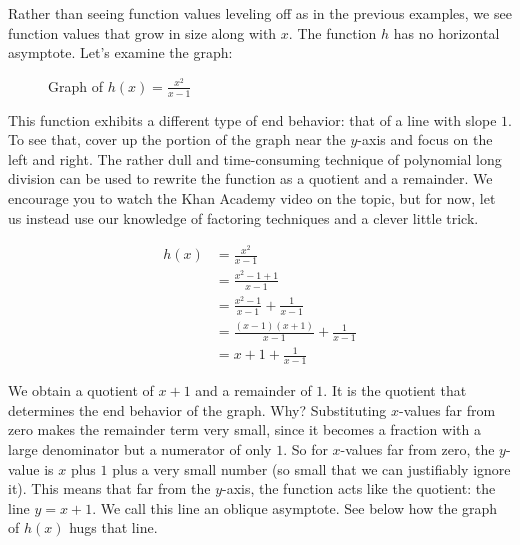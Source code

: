 Rather than seeing function values leveling off as in the previous examples, we see function values that grow in size along with \( x \). The function \( h \) has no horizontal asymptote. Let's examine the graph:

\begin{figure}[htbp]
  \centering
  \caption{Graph of \( h(x) = \frac{x^2}{x - 1} \)}
\end{figure}

This function exhibits a different type of end behavior: that of a line with slope \( 1 \). To see that, cover up the portion of the graph near the \( y \)-axis and focus on the left and right. The rather dull and time-consuming technique of polynomial long division can be used to rewrite the function as a quotient and a remainder. We encourage you to watch the Khan Academy video on the topic, but for now, let us instead use our knowledge of factoring techniques and a clever little trick.

\begin{equation} \label{eq1}
\begin{split}
h(x) & = \frac{x^2}{x - 1} \\
& = \frac{x^2 - 1 + 1}{x - 1} \\ 
& = \frac{x^2 - 1}{x - 1} + \frac{1}{x - 1} \\
& = \frac{(x - 1)(x + 1)}{x - 1} + \frac{1}{x - 1} \\
& = x + 1 + \frac{1}{x - 1}
\end{split}
\end{equation}

We obtain a quotient of \( x + 1 \) and a remainder of \( 1 \). It is the quotient that determines the end behavior of the graph. Why? Substituting \( x \)-values far from zero makes the remainder term very small, since it becomes a fraction with a large denominator but a numerator of only \( 1 \). So for \( x \)-values far from zero, the \( y \)-value is \( x \) plus \( 1 \) plus a very small number (so small that we can justifiably ignore it). This means that far from the \( y \)-axis, the function acts like the quotient: the line \( y = x + 1 \). We call this line an oblique asymptote. See below how the graph of \( h(x) \) hugs that line.

